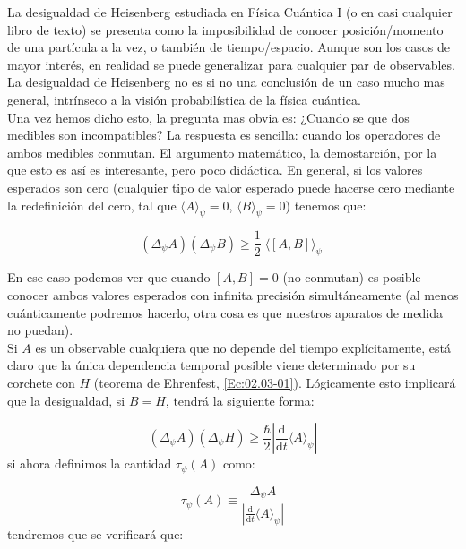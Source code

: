 \documentclass[12pt,a4paper]{book}
\numberwithin{equation}{chapter}
\numberwithin{figure}{chapter}
\newcommand{\D}{\mathrm{d}}
\newcommand{\derivadas}[2]{\frac{\D #1}{\D #2}}
\begin{document}
La desigualdad de Heisenberg estudiada en Física Cuántica I (o en casi cualquier libro de texto) se presenta como la imposibilidad de conocer posición/momento de una partícula a la vez, o también de tiempo/espacio. Aunque son los casos de mayor interés, en realidad se puede generalizar para cualquier par de observables. La desigualdad de Heisenberg no es si no una conclusión de un caso mucho mas general, intrínseco a la visión probabilística de la física cuántica. \\

Una vez hemos dicho esto, la pregunta mas obvia es: ¿Cuando se que dos medibles son incompatibles? La respuesta es sencilla: cuando los operadores de ambos medibles conmutan. El argumento matemático, la demostarción, por la que esto es así es interesante, pero poco didáctica. En general, si los valores esperados son cero (cualquier tipo de valor esperado puede hacerse cero mediante la redefinición del cero, tal que $\langle A \rangle_\psi = 0$, $\langle B \rangle_\psi = 0$) tenemos que:

\begin{equation}
(\Delta_\psi A)( \Delta_\psi B ) \geq \frac{1}{2} \vert \langle [A,B] \rangle_\psi \vert
\end{equation}

En ese caso podemos ver que cuando $[A,B]=0$ (no conmutan) es posible conocer ambos valores esperados con infinita precisión simultáneamente (al menos cuánticamente podremos hacerlo, otra cosa es que nuestros aparatos de medida no puedan). \\

Si $A$ es un observable cualquiera que no depende del tiempo explícitamente, está claro que la única dependencia temporal posible viene determinado por su corchete con $H$ (teorema de Ehrenfest, \ref{Ec:02.03-01}). Lógicamente esto implicará que la desigualdad, si $B=H$, tendrá la siguiente forma:


\begin{equation}
(\Delta_\psi A)( \Delta_\psi H) \geq \frac{\hbar}{2} \left|  \derivadas{}{t} \langle A \rangle_\psi \right|
\end{equation}
si ahora definimos la cantidad $\tau_\psi (A)$ como:

\begin{equation}
\tau_\psi (A) \equiv \frac{\Delta_\psi A}{\left| \derivadas{}{t} \langle A \rangle_\psi \right|}
\end{equation}
tendremos que se verificará que:
\end{document}
